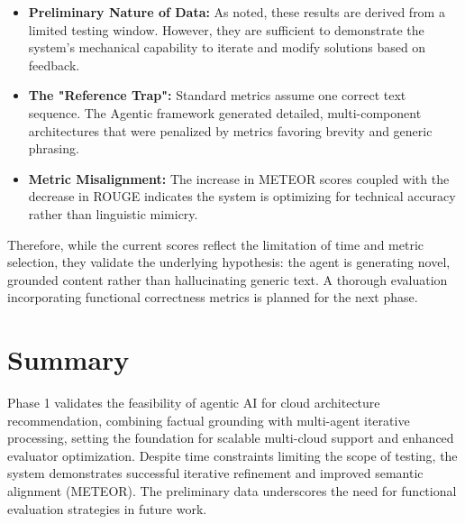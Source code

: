 \begin{itemize}

    \item \textbf{Preliminary Nature of Data:} As noted, these results are derived from a limited testing window. However, they are sufficient to demonstrate the system's mechanical capability to iterate and modify solutions based on feedback.

    \item \textbf{The "Reference Trap":} Standard metrics assume one correct text sequence. The Agentic framework generated detailed, multi-component architectures that were penalized by metrics favoring brevity and generic phrasing.

    \item \textbf{Metric Misalignment:} The increase in METEOR scores coupled with the decrease in ROUGE indicates the system is optimizing for technical accuracy rather than linguistic mimicry. 

\end{itemize}

Therefore, while the current scores reflect the limitation of time and metric selection, they validate the underlying hypothesis: the agent is generating novel, grounded content rather than hallucinating generic text. A thorough evaluation incorporating functional correctness metrics is planned for the next phase.

\section{Summary}

Phase 1 validates the feasibility of agentic AI for cloud architecture recommendation, combining factual grounding with multi-agent iterative processing, setting the foundation for scalable multi-cloud support and enhanced evaluator optimization. Despite time constraints limiting the scope of testing, the system demonstrates successful iterative refinement and improved semantic alignment (METEOR). The preliminary data underscores the need for functional evaluation strategies in future work.
